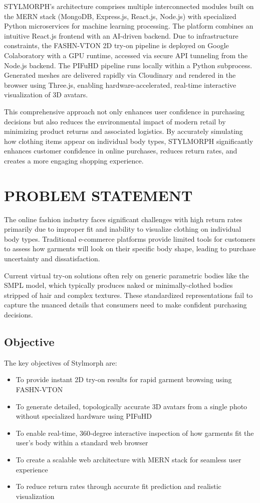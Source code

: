 \documentclass[12pt,a4paper,oneside]{report}
\begin{document}
STYLMORPH's architecture comprises multiple interconnected modules built on the MERN stack (MongoDB, Express.js, React.js, Node.js) with specialized Python microservices for machine learning processing. The platform combines an intuitive React.js frontend with an AI-driven backend. Due to infrastructure constraints, the FASHN-VTON 2D try-on pipeline is deployed on Google Colaboratory with a GPU runtime, accessed via secure API tunneling from the Node.js backend. The PIFuHD pipeline runs locally within a Python subprocess. Generated meshes are delivered rapidly via Cloudinary and rendered in the browser using Three.js, enabling hardware-accelerated, real-time interactive visualization of 3D avatars.

This comprehensive approach not only enhances user confidence in purchasing decisions but also reduces the environmental impact of modern retail by minimizing product returns and associated logistics. By accurately simulating how clothing items appear on individual body types, STYLMORPH significantly enhances customer confidence in online purchases, reduces return rates, and creates a more engaging shopping experience.

\chapter{PROBLEM STATEMENT}

The online fashion industry faces significant challenges with high return rates primarily due to improper fit and inability to visualize clothing on individual body types. Traditional e-commerce platforms provide limited tools for customers to assess how garments will look on their specific body shape, leading to purchase uncertainty and dissatisfaction. 

Current virtual try-on solutions often rely on generic parametric bodies like the SMPL model, which typically produces naked or minimally-clothed bodies stripped of hair and complex textures. These standardized representations fail to capture the nuanced details that consumers need to make confident purchasing decisions.

\section{Objective}

The key objectives of Stylmorph are:
\begin{itemize}
    \item To provide instant 2D try-on results for rapid garment browsing using FASHN-VTON
    \item To generate detailed, topologically accurate 3D avatars from a single photo without specialized hardware using PIFuHD
    \item To enable real-time, 360-degree interactive inspection of how garments fit the user's body within a standard web browser
    \item To create a scalable web architecture with MERN stack for seamless user experience
    \item To reduce return rates through accurate fit prediction and realistic visualization
\end{itemize}
\end{document}
